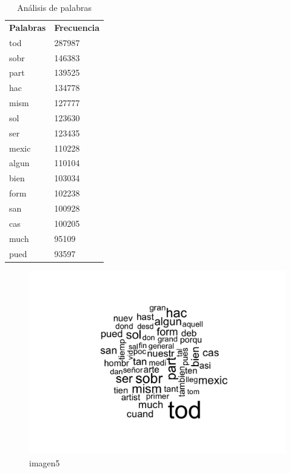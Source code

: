 \begin{table}[]
\centering
\caption{Análisis de palabras}
\label{my-label}
\begin{tabular}{ll}
\textbf{Palabras} & \textbf{Frecuencia} \\
tod               & 287987              \\
sobr              & 146383              \\
part              & 139525              \\
hac               & 134778              \\
mism              & 127777              \\
sol               & 123630              \\
ser               & 123435              \\
mexic             & 110228              \\
algun             & 110104              \\
bien              & 103034              \\
form              & 102238              \\
san               & 100928              \\
cas               & 100205              \\
much              & 95109               \\
pued              & 93597               \\ \hline
\end{tabular}
\end{table}


\begin{figure}[H]
\centering
\includegraphics[width=1\textwidth]{Figures/L6.png}
\caption{imagen5}
\end{figure}



